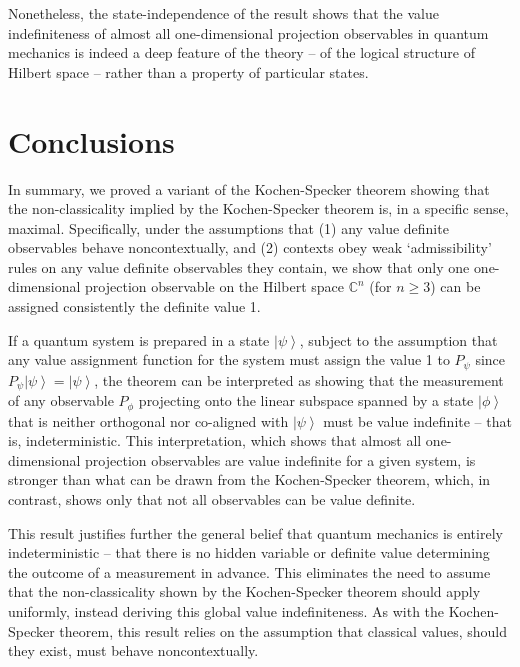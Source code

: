 \documentclass[%
 superscriptaddress,
 preprint,
 showpacs,
 showkeys,
 nofootinbib,
  amsmath,amssymb,
  aps,
  longbibliography,
  floatfix,
 ]{revtex4-1}
\theoremstyle{definition}
\newcommand{\C}{\mathbb{C}}
\newcommand{\ket}[1]{\left| #1 \right>}
\begin{document}
Nonetheless, the state-independence of the result shows that  the value indefiniteness of almost all {\color{blue}one-dimensional projection} observables in quantum mechanics is indeed a deep feature of the theory -- of the logical structure of Hilbert space -- rather than a property of particular states.

\section{Conclusions}

In summary, we proved a variant of the Kochen-Specker theorem showing that the non-classicality implied by the Kochen-Specker theorem is, in a specific sense, maximal.
Specifically, under the assumptions that (1) any value definite observables behave noncontextually, and (2) contexts obey weak `admissibility' rules on any value definite observables they contain, we show that only one {\color{blue} one-dimensional} projection observable on the Hilbert space $\C^n$ (for $n\ge 3$) can be assigned consistently the definite value 1.

If a quantum system is prepared in a state $\ket{\psi}$, subject to the assumption that any value assignment function for the system must assign the value 1 to $P_\psi$ since $P_\psi\ket{\psi}=\ket{\psi}$, the theorem can be interpreted as showing that the measurement of any observable $P_\phi$ projecting onto {\color{blue}the linear subspace spanned by} a state $\ket{\phi}$ that is neither orthogonal nor co-aligned with $\ket{\psi}$ must be value indefinite -- that is, indeterministic.
This interpretation, {\color{blue}which shows that almost all one-dimensional projection observables are value indefinite for a given system}, is stronger than what can be drawn from the Kochen-Specker theorem, which, in contrast, shows only that not all observables can be value definite.

This result justifies further the general belief that quantum mechanics is entirely indeterministic -- that there is no hidden variable or definite value determining the outcome of a measurement in advance.
This eliminates the need to assume that the non-classicality shown by the Kochen-Specker theorem should apply uniformly, instead deriving this global value indefiniteness.
As with the Kochen-Specker theorem, this result relies on the assumption that classical values, should they exist, must behave noncontextually.
\end{document}
